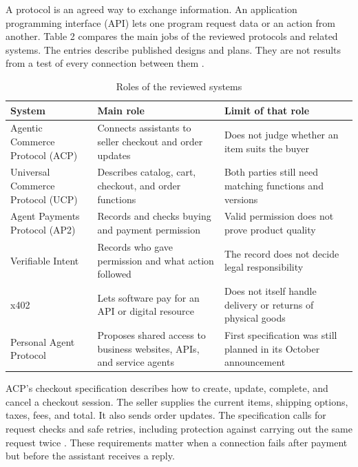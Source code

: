 \documentclass{article}
\begin{document}
A protocol is an agreed way to exchange information. An application programming interface (API) lets one program request data or an action from another. Table 2 compares the main jobs of the reviewed protocols and related systems. The entries describe published designs and plans. They are not results from a test of every connection between them \cite{ref6,ref8,ref9,ref10,ref12,ref14}.

\begin{table}[H]
\centering
\caption{Roles of the reviewed systems}
\footnotesize
\begin{tabularx}{\textwidth}{@{}>{\raggedright\arraybackslash}X>{\raggedright\arraybackslash}X>{\raggedright\arraybackslash}X@{}}
\toprule
\textbf{System} & \textbf{Main role} & \textbf{Limit of that role} \\
\midrule
Agentic Commerce Protocol (ACP) & Connects assistants to seller checkout and order updates & Does not judge whether an item suits the buyer \\[3pt]
Universal Commerce Protocol (UCP) & Describes catalog, cart, checkout, and order functions & Both parties still need matching functions and versions \\[3pt]
Agent Payments Protocol (AP2) & Records and checks buying and payment permission & Valid permission does not prove product quality \\[3pt]
Verifiable Intent & Records who gave permission and what action followed & The record does not decide legal responsibility \\[3pt]
x402 & Lets software pay for an API or digital resource & Does not itself handle delivery or returns of physical goods \\[3pt]
Personal Agent Protocol & Proposes shared access to business websites, APIs, and service agents & First specification was still planned in its October announcement \\[3pt]
\bottomrule
\end{tabularx}
\end{table}

ACP's checkout specification describes how to create, update, complete, and cancel a checkout session. The seller supplies the current items, shipping options, taxes, fees, and total. It also sends order updates. The specification calls for request checks and safe retries, including protection against carrying out the same request twice \cite{ref12}. These requirements matter when a connection fails after payment but before the assistant receives a reply.
\end{document}
